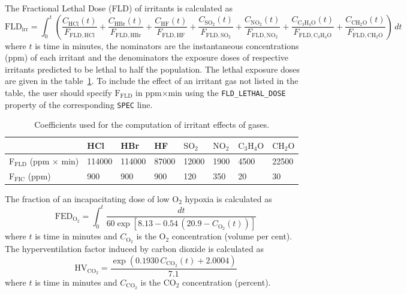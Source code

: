 \documentclass[11pt]{book}
\newcommand{\ct}{\tt\small}
\newcommand{\be}{\begin{equation}}
\newcommand{\ee}{\end{equation}}
\begin{document}
The Fractional Lethal Dose (FLD) of irritants is calculated as
\be
\mathrm{FLD}_\mathrm{irr} = \int_0^t \left(
    \frac{C_\mathrm{HCl}(t)}    {F_\mathrm{FLD,HCl}} +
    \frac{C_\mathrm{HBr}(t)}    {F_\mathrm{FLD,HBr}} +
    \frac{C_\mathrm{HF}(t)}     {F_\mathrm{FLD,HF}} +
    \frac{C_\mathrm{SO_2}(t)}   {F_\mathrm{FLD,SO_2}} +
    \frac{C_\mathrm{NO_2}(t)}   {F_\mathrm{FLD,NO_2}} +
    \frac{C_\mathrm{C_3H_4O}(t)}{F_\mathrm{FLD,C_3H_4O}} +
    \frac{C_\mathrm{CH_2O}(t)}  {F_\mathrm{FLD,CH_2O}}
    \right) \, dt
\ee
where $t$ is time in minutes, the nominators are the instantaneous concentrations (ppm) of each irritant and
the denominators the exposure doses of respective irritants predicted to be lethal to half the population.
The lethal exposure doses~\cite{SFPE:Purser} are given in the table~\ref{tbl:FIC}. To include the effect of an irritant gas not listed in the table,
the user should specify $\mathrm{F_{FLD}}$ in ppm$\times$min using the {\ct FLD\_LETHAL\_DOSE} property of the corresponding {\ct SPEC} line.
\begin{table}[ht]
\caption{Coefficients used for the computation of irritant effects of gases.}
\label{tbl:FIC}
\begin{center}
\begin{tabular}{|l|l|l|l|l|l|l|l|}
\hline & HCl & HBr & HF & $\mathrm{SO_2}$ & $\mathrm{NO_2}$ & $\mathrm{C_3H_4O}$ & $\mathrm{CH_2O}$  \\ \hline \hline
F${}_\mathrm{FLD}$ (ppm $\times$ min) & 114000 & 114000 & 87000 & 12000 & 1900 & 4500 & 22500 \\
F${}_\mathrm{FIC}$ (ppm) & 900 & 900 & 900 & 120 & 350 & 20 & 30 \\ \hline
\end{tabular}
\end{center}
\end{table}

The fraction of an incapacitating dose of low O${}_2$ hypoxia is calculated as
\be
\mathrm{FED}_\mathrm{O_2} =  \int_0^t \frac{dt}{60 \exp \left [ 8.13 - 0.54 \, (20.9 - C_\mathrm{O_2}(t)) \right ] }
\ee
where $t$ is time in minutes and $C_\mathrm{O_2}$ is the O${}_2$ concentration (volume per cent).
The hyperventilation factor induced by carbon dioxide is calculated as
\be
\mathrm{HV}_\mathrm{CO_2} = \frac{ \exp( 0.1930 \, C_\mathrm{CO_2}(t) +  2.0004 ) }{7.1} \label{co2hyp}
\ee
where $t$ is time in minutes and $C_\mathrm{CO_2}$ is the CO${}_2$ concentration (percent).
\end{document}
